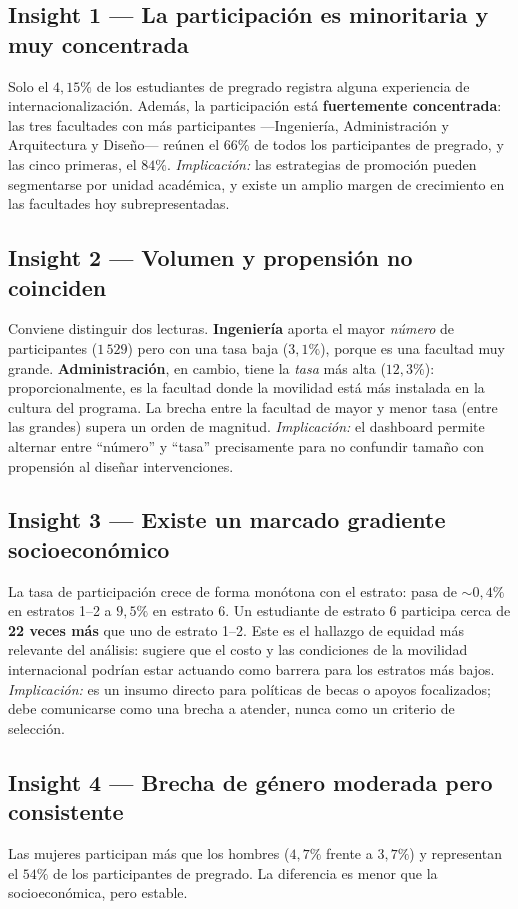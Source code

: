 \documentclass[12pt,a4paper]{article}
\begin{document}
\subsection*{Insight 1 --- La participación es minoritaria y muy concentrada}
Solo el $4{,}15\%$ de los estudiantes de pregrado registra alguna experiencia de
internacionalización. Además, la participación está \textbf{fuertemente
concentrada}: las tres facultades con más participantes ---Ingeniería,
Administración y Arquitectura y Diseño--- reúnen el $66\%$ de todos los
participantes de pregrado, y las cinco primeras, el $84\%$.
\emph{Implicación:} las estrategias de promoción pueden segmentarse por unidad
académica, y existe un amplio margen de crecimiento en las facultades hoy
subrepresentadas.

\subsection*{Insight 2 --- Volumen y propensión no coinciden}
Conviene distinguir dos lecturas. \textbf{Ingeniería} aporta el mayor
\emph{número} de participantes ($1\,529$) pero con una tasa baja ($3{,}1\%$),
porque es una facultad muy grande. \textbf{Administración}, en cambio, tiene la
\emph{tasa} más alta ($12{,}3\%$): proporcionalmente, es la facultad donde la
movilidad está más instalada en la cultura del programa. La brecha entre la
facultad de mayor y menor tasa (entre las grandes) supera un orden de magnitud.
\emph{Implicación:} el dashboard permite alternar entre ``número'' y ``tasa''
precisamente para no confundir tamaño con propensión al diseñar intervenciones.

\subsection*{Insight 3 --- Existe un marcado gradiente socioeconómico}
La tasa de participación crece de forma monótona con el estrato: pasa de
$\sim 0{,}4\%$ en estratos 1--2 a $9{,}5\%$ en estrato 6. Un estudiante de estrato
6 participa cerca de \textbf{22 veces más} que uno de estrato 1--2. Este es el
hallazgo de equidad más relevante del análisis: sugiere que el costo y las
condiciones de la movilidad internacional podrían estar actuando como barrera
para los estratos más bajos. \emph{Implicación:} es un insumo directo para
políticas de becas o apoyos focalizados; debe comunicarse como una brecha a
atender, nunca como un criterio de selección.

\subsection*{Insight 4 --- Brecha de género moderada pero consistente}
Las mujeres participan más que los hombres ($4{,}7\%$ frente a $3{,}7\%$) y
representan el $54\%$ de los participantes de pregrado. La diferencia es menor que
la socioeconómica, pero estable.
\end{document}
